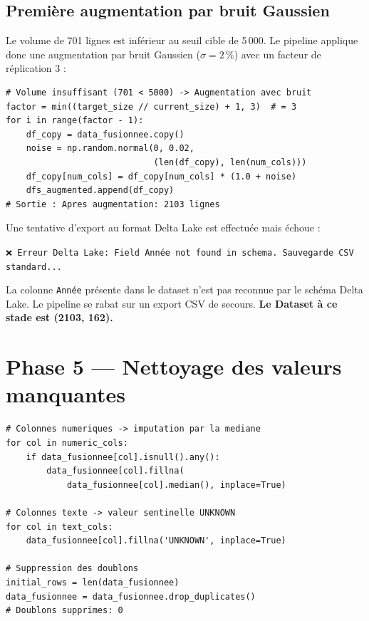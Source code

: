 \documentclass[12pt,a4paper,oneside]{report}
\newcommand{\code}[1]{\texttt{\small #1}}
\begin{document}
\subsection{Première augmentation par bruit Gaussien}

Le volume de 701 lignes est inférieur au seuil cible de 5\,000. Le pipeline applique donc une augmentation par bruit Gaussien ($\sigma = 2\,\%$) avec un facteur de réplication 3 :

\begin{lstlisting}[caption={Augmentation Phase 3 : bruit Gaussien 2\% (sortie réelle)}]
# Volume insuffisant (701 < 5000) -> Augmentation avec bruit
factor = min((target_size // current_size) + 1, 3)  # = 3
for i in range(factor - 1):
    df_copy = data_fusionnee.copy()
    noise = np.random.normal(0, 0.02,
                             (len(df_copy), len(num_cols)))
    df_copy[num_cols] = df_copy[num_cols] * (1.0 + noise)
    dfs_augmented.append(df_copy)
# Sortie : Apres augmentation: 2103 lignes
\end{lstlisting}

\begin{warnbox}
Une tentative d'export au format Delta Lake est effectuée mais échoue :

\texttt{❌ Erreur Delta Lake: Field Année not found in schema. Sauvegarde CSV standard...}

La colonne \code{Année} présente dans le dataset n'est pas reconnue par le schéma Delta Lake. Le pipeline se rabat sur un export CSV de secours. \textbf{Le Dataset à ce stade est (2103, 162).}
\end{warnbox}

\section{Phase 5 — Nettoyage des valeurs manquantes}

\begin{lstlisting}[caption={Traitement des valeurs manquantes — Phase 5}]
# Colonnes numeriques -> imputation par la mediane
for col in numeric_cols:
    if data_fusionnee[col].isnull().any():
        data_fusionnee[col].fillna(
            data_fusionnee[col].median(), inplace=True)

# Colonnes texte -> valeur sentinelle UNKNOWN
for col in text_cols:
    data_fusionnee[col].fillna('UNKNOWN', inplace=True)

# Suppression des doublons
initial_rows = len(data_fusionnee)
data_fusionnee = data_fusionnee.drop_duplicates()
# Doublons supprimes: 0
\end{lstlisting}
\end{document}
